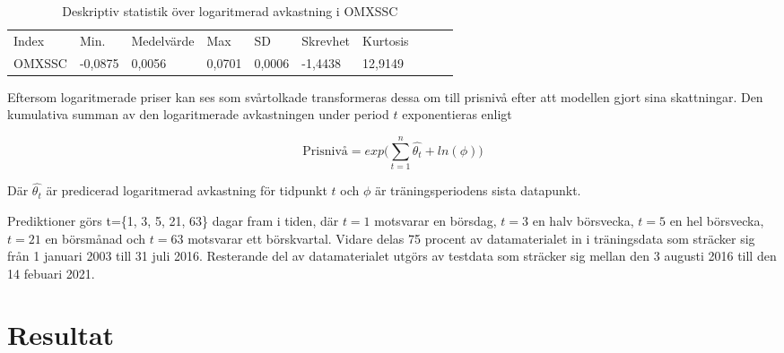 \documentclass[11pt]{article}
\numberwithin{equation}{section}
\numberwithin{table}{section}
\numberwithin{figure}{section}
\begin{document}
\begin{table}[H]
\caption{Deskriptiv statistik över logaritmerad avkastning i OMXSSC}
\begin{tabular}{@{}llllllllll@{}}
\cmidrule(r){1-7}
%
Index  & Min.    & Medelvärde & Max    & SD     & Skrevhet & Kurtosis \\ \cmidrule(r){1-7}
OMXSSC & -0,0875 & 0,0056     & 0,0701 & 0,0006 & -1,4438  & 12,9149  \\ \cmidrule(r){1-7}
\end{tabular}
\end{table}



Eftersom logaritmerade priser kan ses som svårtolkade transformeras dessa om till prisnivå efter att modellen gjort sina skattningar. Den kumulativa summan av den logaritmerade avkastningen under period $t$ exponentieras enligt

\begin{equation}
    \text{Prisnivå} =  exp\Big({\sum\limits_{t=1}^n \hat{\theta_{t}}} + ln(\phi)\Big)
\end{equation}

Där  $\hat{\theta_t}$ är predicerad logaritmerad avkastning för tidpunkt $t$ och $\phi$ är träningsperiodens sista datapunkt. 




Prediktioner görs t=\{1, 3, 5, 21, 63\} dagar fram i tiden, där $t=1$ motsvarar en börsdag,  $t=3$ en halv börsvecka, $t=5$ en hel börsvecka, $t=21$ en börsmånad och $t=63$ motsvarar ett börskvartal. Vidare delas 75 procent av datamaterialet in i träningsdata som sträcker sig från 1 januari 2003 till 31 juli 2016. Resterande del av datamaterialet utgörs av testdata som sträcker sig mellan den 3 augusti 2016 till den 14 febuari 2021. 

\newpage
\section{Resultat}
\end{document}

